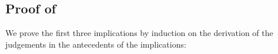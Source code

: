 \subsection*{Proof of }


We prove the first three implications by induction on the derivation of the
judgements in the antecedents of the implications:

